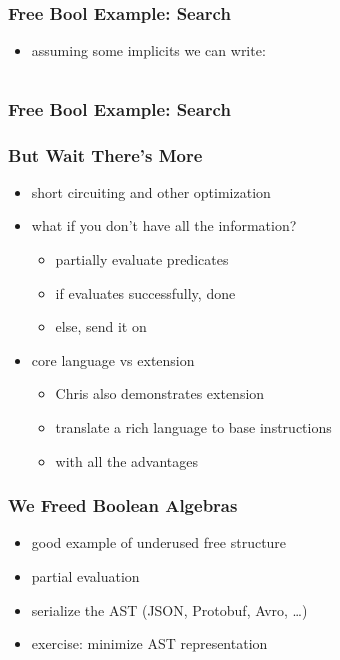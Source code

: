 \documentclass{beamer}
\begin{document}
\begin{frame}
  \frametitle{Free Bool Example: Search}
  \begin{itemize}
  \item assuming some implicits we can write:
  \end{itemize}
  \inputminted{scala}{snippets/example-search-predicate.scala}
\end{frame}

\begin{frame}
  \frametitle{Free Bool Example: Search}
\end{frame}

\begin{frame}
  \frametitle{But Wait There's More}
  \begin{itemize}
  \item short circuiting and other optimization
  \item what if you don't have all the information?
    \begin{itemize}
    \item partially evaluate predicates
    \item if evaluates successfully, done
    \item else, send it on
    \end{itemize}
  \item core language vs extension
    \begin{itemize}
    \item Chris also demonstrates extension
    \item translate a rich language to base instructions
    \item with all the advantages
    \end{itemize}
  \end{itemize}
\end{frame}

\begin{frame}
  \frametitle{We Freed Boolean Algebras}
  \begin{itemize}
  \item good example of underused free structure
  \item partial evaluation
  \item serialize the AST (JSON, Protobuf, Avro, \ldots{})
  \item exercise: minimize AST representation
  \end{itemize}
\end{frame}
\end{document}
